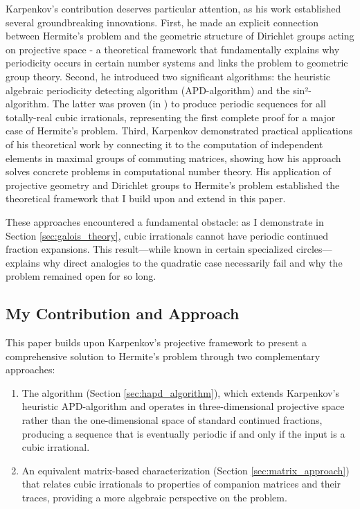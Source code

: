 Karpenkov's contribution deserves particular attention, as his work established several groundbreaking innovations. First, he made an explicit connection between Hermite's problem and the geometric structure of Dirichlet groups acting on projective space - a theoretical framework that fundamentally explains why periodicity occurs in certain number systems and links the problem to geometric group theory. Second, he introduced two significant algorithms: the heuristic algebraic periodicity detecting algorithm (APD-algorithm) and the sin²-algorithm. The latter was proven (in \cite{Karpenkov2019}) to produce periodic sequences for all totally-real cubic irrationals, representing the first complete proof for a major case of Hermite's problem. Third, Karpenkov demonstrated practical applications of his theoretical work by connecting it to the computation of independent elements in maximal groups of commuting matrices, showing how his approach solves concrete problems in computational number theory. His application of projective geometry and Dirichlet groups to Hermite's problem established the theoretical framework that I build upon and extend in this paper.

These approaches encountered a fundamental obstacle: as I demonstrate in Section \ref{sec:galois_theory}, cubic irrationals cannot have periodic continued fraction expansions. This result—while known in certain specialized circles—explains why direct analogies to the quadratic case necessarily fail and why the problem remained open for so long.

\subsection{My Contribution and Approach}

This paper builds upon Karpenkov's projective framework to present a comprehensive solution to Hermite's problem through two complementary approaches:

\begin{enumerate}
    \item The \HAPD{} algorithm (Section \ref{sec:hapd_algorithm}), which extends Karpenkov's heuristic APD-algorithm and operates in three-dimensional projective space rather than the one-dimensional space of standard continued fractions, producing a sequence that is eventually periodic if and only if the input is a cubic irrational.
    
    \item An equivalent matrix-based characterization (Section \ref{sec:matrix_approach}) that relates cubic irrationals to properties of companion matrices and their traces, providing a more algebraic perspective on the problem.
\end{enumerate}

